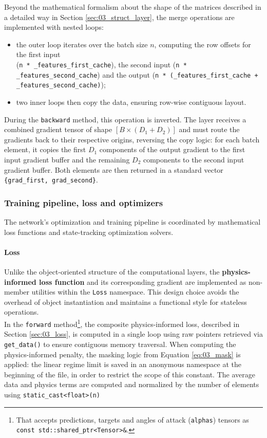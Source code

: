 Beyond the mathematical formalism about the shape of the matrices described in a detailed way in Section \ref{sec:03_struct_layer}, the merge operations are implemented with nested loops:
\begin{itemize}
    \item[-] the outer loop iterates over the batch size $n$, computing the row offsets for the first input \\(\texttt{n * \_features\_first\_cache}), the second input (\texttt{n * \_features\_second\_cache}) and the output (\texttt{n * (\_features\_first\_cache + \_features\_second\_cache)});
    \item[-] two inner loops then copy the data, ensuring row-wise contiguous layout. 
\end{itemize}
\vspace{2ex}
During the \texttt{backward} method, this operation is inverted. The layer receives a combined gradient tensor of shape $[B \times (D_1 + D_2)]$ and must route the gradients back to their respective origins, reversing the copy logic: for each batch element, it copies the first $D_1$ components of the output gradient to the first input gradient buffer and the remaining $D_2$ components to the second input gradient buffer. Both elements are then returned in a standard vector \texttt{\{grad\_first, grad\_second\}}.

\subsubsection{Training pipeline, loss and optimizers}

The network's optimization and training pipeline is coordinated by mathematical loss functions and state-tracking optimization solvers.

\paragraph{Loss}

Unlike the object-oriented structure of the computational layers, the \textbf{physics-informed loss function} and its corresponding gradient are implemented as non-member utilities within the \texttt{Loss} namespace. This design choice avoids the overhead of object instantiation and maintains a functional style for stateless operations.\\

In the \texttt{forward} method\footnote{That accepts predictions, targets and angles of attack (\texttt{alphas}) tensors as \texttt{const std::shared\_ptr<Tensor>\&}.}, the composite physics-informed loss, described in Section \ref{sec:03_loss}, is computed in a single loop using raw pointers retrieved via \texttt{get\_data()} to ensure contiguous memory traversal. When computing the physics-informed penalty, the masking logic from Equation \eqref{eq:03_mask} is applied: the linear regime limit is saved in an anonymous namespace at the beginning of the file, in order to restrict the scope of this constant. The average data and physics terms are computed and normalized by the number of elements using \texttt{static\_cast<float>(n)}\\

